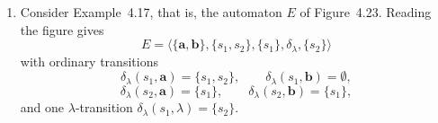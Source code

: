 \begin{enumerate}[{4.}1.]
\begin{enumerate}[(a)]
\item Figure~4.25(e): start state $\{s_1,s_2\}$, final state $\{s_1,s_2\}$.
\[
\begin{array}{c|ccc}
 & \pmb{a} & \pmb{b} & \pmb{c}\\\hline
\{s_1,s_2\} & \{s_1,s_2\} & \{s_1\} & \emptyset\\
\{s_1\} & \{s_1,s_2\} & \emptyset & \emptyset\\
\emptyset & \emptyset & \emptyset & \emptyset
\end{array}
\]

\item Figure~4.25(f): after taking the $\lambda$-closures, the connected DFA has
start state $\{s_0\}$ and final state $\{s_0,s_1,s_3\}$.
\[
\begin{array}{c|ccc}
 & \pmb{a} & \pmb{b} & \pmb{c}\\\hline
\{s_0\} & \{s_0,s_1\} & \emptyset & \emptyset\\
\{s_0,s_1\} & \{s_0,s_1\} & \emptyset & \{s_2\}\\
\{s_2\} & \emptyset & \emptyset & \{s_0,s_1,s_3\}\\
\{s_0,s_1,s_3\} & \{s_0,s_1\} & \emptyset & \{s_2\}\\
\emptyset & \emptyset & \emptyset & \emptyset
\end{array}
\]

\item Figure~4.25(g): start state $\{s_0\}$, final state $\{s_0\}$.
\[
\begin{array}{c|ccc}
 & \pmb{a} & \pmb{b} & \pmb{c}\\\hline
\{s_0\} & \{s_1\} & \emptyset & \emptyset\\
\{s_1\} & \{s_0\} & \{s_3\} & \{s_2\}\\
\{s_2\} & \emptyset & \emptyset & \{s_1\}\\
\{s_3\} & \emptyset & \{s_1\} & \emptyset\\
\emptyset & \emptyset & \emptyset & \emptyset
\end{array}
\]
\end{enumerate}

\item Consider Example~4.17, that is, the automaton $E$ of Figure~4.23.
Reading the figure gives
\[
E=\langle\{\pmb{a},\pmb{b}\},\{s_1,s_2\},\{s_1\},\delta_{\lambda},\{s_2\}\rangle
\]
with ordinary transitions
\[
\delta_{\lambda}(s_1,\pmb{a})=\{s_1,s_2\},\qquad
\delta_{\lambda}(s_1,\pmb{b})=\emptyset,
\]
\[
\delta_{\lambda}(s_2,\pmb{a})=\{s_1\},\qquad
\delta_{\lambda}(s_2,\pmb{b})=\{s_1\},
\]
and one $\lambda$-transition $\delta_{\lambda}(s_1,\lambda)=\{s_2\}$.


\end{enumerate}
